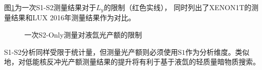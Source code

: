 图\ref{fig:ly_sensitivity_s1s2}为一次S1-S2测量结果对于$L_y$的限制（红色实线），
同时列出了XENON1T的测量结果\cite{aprile_search_2021}和LUX 2016年测量结果\cite{lux_collaboration_low-energy_2016}作为对比。

\begin{figure}
  \centering
  
  \caption{\label{fig:ly_sensitivity_s1s2} 一次S2-Only测量对液氙光产额的限制}
\end{figure}

S1-S2分析同样受限于统计量，但测量光产额则必须使用$\mathrm{S1}$作为分析维度。类似地，对低能核反冲光产额测量结果的提升将有利于基于液氙的轻质量暗物质搜索。
